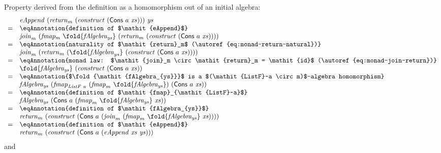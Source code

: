 Property derived from the definition as a homomorphism out of an
initial algebra:
\begin{displaymath}
  \begin{array}{cl}
    & \mathit{eAppend}~(\mathit{return}_m~(\mathit{construct}~(\mathsf{Cons}~a~\mathit{xs})))~\mathit{ys} \\
    =&\eqAnnotation{definition of $\mathit{eAppend}$} \\
    & \mathit{join}_m~(\mathit{fmap_m}~\fold{\mathit{fAlgebra_{ys}}}~(\mathit{return}_m~(\mathit{construct}~(\mathsf{Cons}~a~\mathit{xs})))) \\
    =&\eqAnnotation{naturality of $\mathit{return}_m$ (\autoref{eq:monad-return-natural})} \\
    & \mathit{join}_m~(\mathit{return}_m~(\fold{\mathit{fAlgebra}_{ys}}~(\mathit{construct}~(\mathsf{Cons}~a~\mathit{xs})))) \\
    =&\eqAnnotation{monad law: $\mathit{join}_m \circ \mathit{return}_m = \mathit{id}$ (\autoref{eq:monad-join-return})} \\
    & \fold{\mathit{fAlgebra_{ys}}}~(\mathit{construct}~(\mathsf{Cons}~a~\mathit{xs})) \\
    =&\eqAnnotation{$\fold{\mathit{fAlgebra_{ys}}}$ is a $(\mathit{ListF}~a \circ m)$-algebra homomorphism} \\
    & \mathit{fAlgebra_{ys}}~(\mathit{fmap}_{\mathit{ListF}~a}~(\mathit{fmap}_m~\fold{\mathit{fAlgebra_{ys}}})~(\mathsf{Cons}~a~\mathit{xs})) \\
    =&\eqAnnotation{definition of $\mathit{fmap}_{\mathit{ListF}~a}$} \\
    & \mathit{fAlgebra_{ys}}~(\mathsf{Cons}~a~(\mathit{fmap}_m~\fold{\mathit{fAlgebra_{ys}}}~\mathit{xs})) \\
    =&\eqAnnotation{definition of $\mathit{fAlgebra_{ys}}$} \\
    & \mathit{return}_m~(\mathit{construct}~(\mathsf{Cons}~a~(\mathit{join}_m~(\mathit{fmap}_m~\fold{\mathit{fAlgebra_{ys}}}~\mathit{xs})))) \\
    =&\eqAnnotation{definition of $\mathit{eAppend}$} \\
    & \mathit{return}_m~(\mathit{construct}~(\mathsf{Cons}~a~(\mathit{eAppend}~\mathit{xs}~\mathit{ys})))
  \end{array}
\end{displaymath}
and
